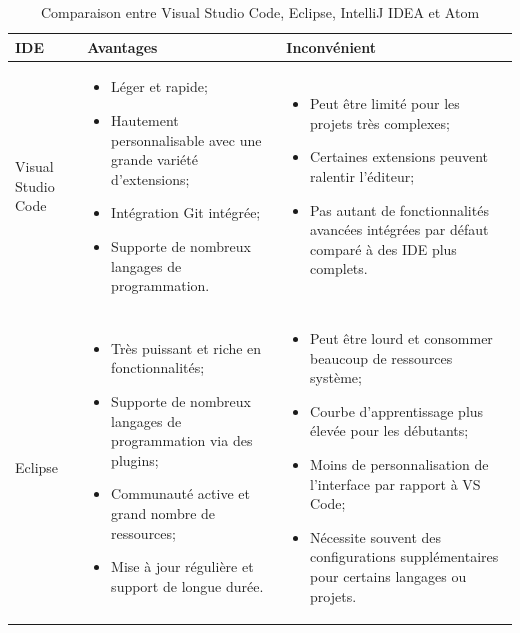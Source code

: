 \documentclass[12pt]{report}
\begin{document}
				\begin{longtable}{|p{3cm}|p{5.5cm}|p{5.5cm}|} 
						\caption{Comparaison entre Visual Studio Code, Eclipse, IntelliJ IDEA et Atom} 
						\label{tab:IDE}\\ 
						\hline 
						\textbf{IDE}  & \textbf{Avantages} & \textbf{Inconvénient}\\ 
						\hline 
						\endfirsthead 	
						\endhead
						Visual Studio Code &
						\begin{itemize}
							\item Léger et rapide;
							\item Hautement personnalisable avec une grande variété d'extensions;
							\item Intégration Git intégrée;
							\item Supporte de nombreux langages de programmation.
						\end{itemize}
						&
						\begin{itemize}
							\item Peut être limité pour les projets très complexes;
							\item Certaines extensions peuvent ralentir l'éditeur;
							\item Pas autant de fonctionnalités avancées intégrées par défaut comparé à des IDE plus complets.
						\end{itemize}\\
						\hline
						Eclipse & 
						\begin{itemize}
							\item Très puissant et riche en fonctionnalités;
							\item Supporte de nombreux langages de programmation via des plugins;
							\item Communauté active et grand nombre de ressources;
							\item Mise à jour régulière et support de longue durée.
						\end{itemize}
						&
						\begin{itemize}
							\item Peut être lourd et consommer beaucoup de ressources système;
							\item Courbe d'apprentissage plus élevée pour les débutants;
							\item Moins de personnalisation de l'interface par rapport à VS Code;
							\item Nécessite souvent des configurations supplémentaires pour certains langages ou projets.
						\end{itemize}\\

\end{longtable}
\end{document}
